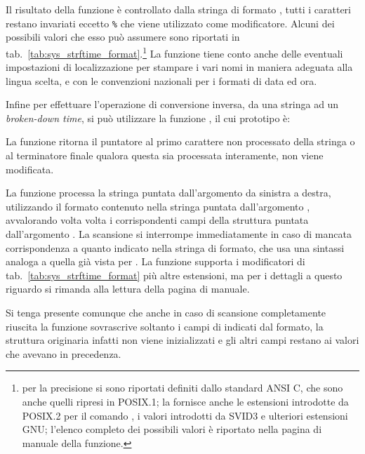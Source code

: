 Il risultato della funzione è controllato dalla stringa di formato
, tutti i caratteri restano invariati eccetto \texttt{\%} che
viene utilizzato come modificatore. Alcuni dei possibili valori che esso può
assumere sono riportati in tab.~\ref{tab:sys_strftime_format}.\footnote{per la
  precisione si sono riportati definiti dallo standard ANSI C, che sono anche
  quelli ripresi in POSIX.1; la  fornisce anche le estensioni
  introdotte da POSIX.2 per il comando , i valori introdotti da
  SVID3 e ulteriori estensioni GNU; l'elenco completo dei possibili valori è
  riportato nella pagina di manuale della funzione.} La funzione tiene conto
anche delle eventuali impostazioni di localizzazione per stampare i vari nomi
in maniera adeguata alla lingua scelta, e con le convenzioni nazionali per i
formati di data ed ora.

Infine per effettuare l'operazione di conversione inversa, da una stringa ad
un \textit{broken-down time}, si può utilizzare la funzione ,
il cui prototipo è:

\begin{funcproto}{
}

{La funzione ritorna il puntatore al primo carattere non processato della
  stringa o al terminatore finale qualora questa sia processata interamente,
   non viene modificata.}
\end{funcproto}

La funzione processa la stringa puntata dall'argomento  da sinistra a
destra, utilizzando il formato contenuto nella stringa puntata
dall'argomento , avvalorando volta volta i corrispondenti campi
della struttura puntata dall'argomento . La scansione si interrompe
immediatamente in caso di mancata corrispondenza a quanto indicato nella
stringa di formato, che usa una sintassi analoga a quella già vista per
. La funzione supporta i modificatori di
tab.~\ref{tab:sys_strftime_format} più altre estensioni, ma per i dettagli a
questo riguardo si rimanda alla lettura della pagina di manuale.

Si tenga presente comunque che anche in caso di scansione completamente
riuscita la funzione sovrascrive soltanto i campi di  indicati dal
formato, la struttura originaria infatti non viene inizializzati e gli altri
campi restano ai valori che avevano in precedenza.


